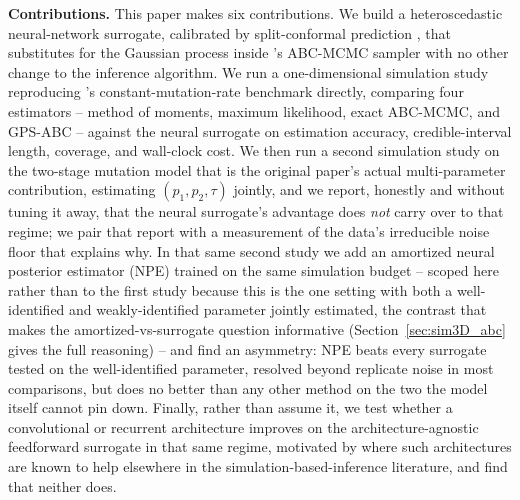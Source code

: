 \documentclass[sn-basic,iicol,pdflatex]{sn-jnl}
\begin{document}
\noindent\textbf{Contributions.} This paper makes six contributions. We build
a heteroscedastic neural-network surrogate, calibrated by split-conformal
prediction \citep{lei2018}, that substitutes for the Gaussian process inside
\citeauthor{lu2023}'s ABC-MCMC sampler with no other change to the inference
algorithm. We run a one-dimensional simulation study reproducing
\citeauthor{lu2023}'s constant-mutation-rate benchmark directly, comparing
four estimators -- method of moments, maximum likelihood, exact ABC-MCMC, and
GPS-ABC -- against the neural surrogate on estimation accuracy,
credible-interval length, coverage, and wall-clock cost. We then run a second
simulation study on the two-stage mutation model that is the original paper's
actual multi-parameter contribution, estimating $(p_1,p_2,\tau)$ jointly, and
we report, honestly and without tuning it away, that the neural surrogate's
advantage does \emph{not} carry over to that regime; we pair that report with
a measurement of the data's irreducible noise floor that explains why. In
that same second study we add an amortized neural posterior estimator (NPE)
trained on the same simulation budget -- scoped here rather than to the
first study because this is the one setting with both a well-identified and
weakly-identified parameter jointly estimated, the contrast that makes the
amortized-vs-surrogate question informative (Section~\ref{sec:sim3D_abc}
gives the full reasoning) -- and find an asymmetry: NPE beats every
surrogate tested on the well-identified parameter, resolved beyond replicate
noise in most comparisons, but does no better than any other method on the
two the model itself cannot pin down. Finally,
rather than assume it, we test whether a convolutional or recurrent
architecture improves on the architecture-agnostic feedforward surrogate in
that same regime, motivated by where such architectures are known
to help elsewhere in the simulation-based-inference literature, and find
that neither does.
\end{document}
